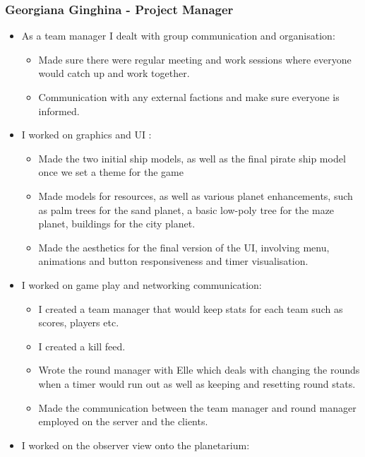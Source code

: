 \documentclass[11pt,a4paper]{article}
\begin{document}
        \subsubsection{Georgiana Ginghina - Project Manager }
        \begin{itemize}
          \item As a team manager I dealt with group communication and organisation:
          \begin{itemize}
            \item Made sure there were regular meeting and work sessions where everyone would catch up and work together.
            \item Communication with any external factions and make sure everyone is informed.
          \end{itemize}
          \item I worked on graphics and UI :
          \begin{itemize}
            \item Made the two initial ship models, as well as the final pirate ship model once we set a theme for the game
            \item Made models for resources, as well as various planet enhancements, such as palm trees for the sand planet, a basic low-poly tree for the maze planet, buildings for the city planet.
            \item Made the aesthetics for the final version of the UI, involving menu, animations and button responsiveness and timer visualisation. 
          \end{itemize}
          \item I worked on game play and networking communication:
          \begin{itemize}
            \item I created a team manager that would keep stats for each team such as scores, players etc.
            \item I created a kill feed.
            \item Wrote the round manager with Elle which deals with changing the rounds when a timer would run out as well as keeping and resetting round stats.
            \item Made the communication between the team manager and round manager employed on the server and the clients.
          \end{itemize}
          \item I worked on the observer view onto the planetarium:
          \begin{itemize}

\end{itemize}
\end{itemize}
\end{document}
